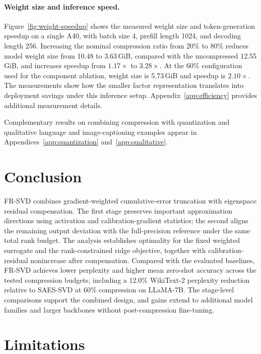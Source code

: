 \documentclass[11pt]{article}
\begin{document}
\paragraph{Weight size and inference speed.}
Figure~\ref{fig:weight-speedup} shows the measured weight size and token-generation speedup on a single A40, with batch size 4, prefill length 1024, and decoding length 256. Increasing the nominal compression ratio from 20\% to 80\% reduces model weight size from 10.48 to 3.63\,GiB, compared with the uncompressed 12.55\,GiB, and increases speedup from $1.17\times$ to $3.28\times$. At the 60\% configuration used for the component ablation, weight size is 5.73\,GiB and speedup is $2.10\times$. The measurements show how the smaller factor representation translates into deployment savings under this inference setup. Appendix~\ref{app:efficiency} provides additional measurement details.



Complementary results on combining compression with quantization and qualitative language and image-captioning examples appear in Appendices~\ref{app:quantization} and~\ref{app:qualitative}.

\section{Conclusion}\label{sec:conclusion}

FR-SVD combines gradient-weighted cumulative-error truncation with eigenspace residual compensation. The first stage preserves important approximation directions using activation and calibration-gradient statistics; the second aligns the remaining output deviation with the full-precision reference under the same total rank budget. The analysis establishes optimality for the fixed weighted surrogate and the rank-constrained ridge objective, together with calibration-residual nonincrease after compensation. Compared with the evaluated baselines, FR-SVD achieves lower perplexity and higher mean zero-shot accuracy across the tested compression budgets, including a 12.0\% WikiText-2 perplexity reduction relative to SAES-SVD at 60\% compression on LLaMA-7B. The stage-level comparisons support the combined design, and gains extend to additional model families and larger backbones without post-compression fine-tuning.
\FloatBarrier
\label{main:end}

\section*{Limitations}
\end{document}
